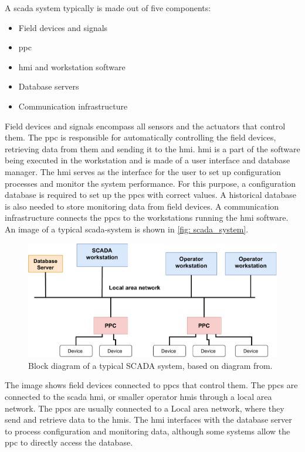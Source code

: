 \documentclass[main.tex]{subfiles}
\begin{document}
A \gls{scada} system typically is made out of five components:

\begin{itemize}
    \item Field devices and signals
    \item \acrfull{ppc}
    \item \acrfull{hmi} and workstation software
    \item Database servers
    \item Communication infrastructure
\end{itemize}

Field devices and signals encompass all sensors and the actuators that control them. The \gls{ppc} is responsible for automatically controlling the field devices, retrieving data from them and sending it to the \gls{hmi}. \gls{hmi} is a part of the software being executed in the workstation and is made of a user interface and database manager. The \gls{hmi} serves as the interface for the user to set up configuration processes and monitor the system performance. For this purpose, a configuration database is required to set up the \gls{ppc}s with correct values. A historical database is also needed to store monitoring data from field devices. A communication infrastructure connects the \gls{ppc}s to the workstations running the  \gls{hmi} software. An image of a typical \gls{scada}-system is shown in \autoref{fig: scada_system}.

\begin{figure}[!ht]
    \centering
    \includegraphics[scale=0.6]{images/scada_system.pdf}
    \caption{Block diagram of a typical SCADA system, based on diagram from\cite{scada_design}.}
    \label{fig: scada_system}
\end{figure}
\FloatBarrier

The image shows field devices connected to \gls{ppc}s that control them. The \gls{ppc}s are connected to the \gls{scada} \gls{hmi}, or smaller operator \gls{hmi}s through a local area network. The \gls{ppc}s are usually connected to a Local area network, where they send and retrieve data to the  \gls{hmi}s. The \gls{hmi} interfaces with the database server to process configuration and monitoring data, although some systems allow the \gls{ppc} to directly access the database.
\end{document}
